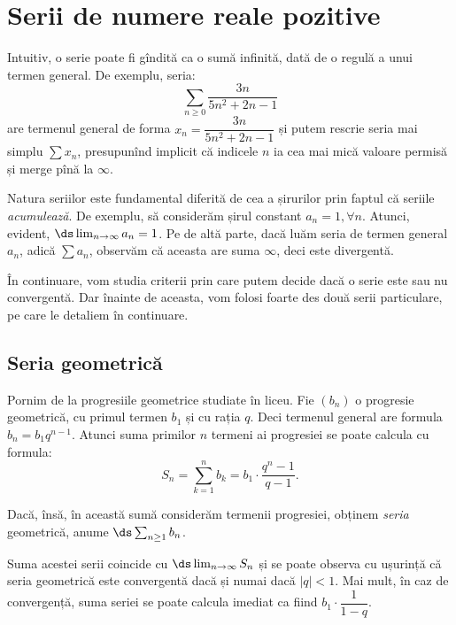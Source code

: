 \chapter{Serii de numere reale pozitive}

Intuitiv, o serie poate fi gîndită ca o sumă infinită, dată de o
regulă a unui termen general. De exemplu, seria:
\[
    \sum_{n \geq 0} \dfrac{3n}{5n^2 + 2n - 1}
\]
are termenul general de forma $ x_n = \dfrac{3n}{5n^2 + 2n - 1} $
și putem rescrie seria mai simplu $ \sum x_n $, presupunînd implicit
că indicele $ n $ ia cea mai mică valoare permisă și merge pînă la $ \infty $.

Natura seriilor este fundamental diferită de cea a șirurilor prin faptul că
seriile \emph{acumulează}. De exemplu, să considerăm șirul constant $ a_n = 1, \forall n $.
Atunci, evident, $ \ds\lim_{n \to \infty} a_n = 1 $. Pe de altă parte, dacă luăm
seria de termen general $ a_n $, adică $ \sum a_n $, observăm că aceasta are suma $ \infty $,
deci este divergentă.

În continuare, vom studia criterii prin care putem decide dacă o serie este
sau nu convergentă. Dar înainte de aceasta, vom folosi foarte des două serii
particulare, pe care le detaliem în continuare.

\section{Seria geometrică}

Pornim de la progresiile geometrice studiate în liceu. Fie $ (b_n) $ o progresie
geometrică, cu primul termen $ b_1 $ și cu rația $ q $. Deci termenul general
are formula $ b_n = b_1 q^{n-1} $. Atunci suma primilor $ n $ termeni ai progresiei
se poate calcula cu formula:
\[
    S_n = \sum_{k = 1}^n b_k = b_1 \cdot \dfrac{q^n - 1}{q - 1}.
\]

Dacă, însă, în această sumă considerăm  termenii progresiei, obținem
\emph{seria} geometrică, anume $ \ds\sum_{n \geq 1} b_n $.

Suma acestei serii coincide cu $ \ds\lim_{n \to \infty} S_n $ și se poate
observa cu ușurință că seria geometrică este convergentă dacă și numai dacă
$ |q| < 1 $. Mai mult, în caz de convergență, suma seriei se poate calcula
imediat ca fiind $ b_1 \cdot \dfrac{1}{1 - q} $.

